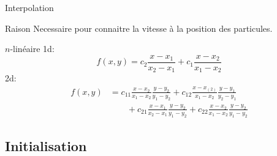 \begin{frame}{Interpolation}
\begin{block}{Raison}
 Necessaire pour connaitre la vitesse à la position des particules.
\end{block}

 \begin{block}{$n$-linéaire}
  1d:
  \begin{equation*}
	f(x,y)=c_2\frac{x-x_{1}}{x_{2}-x_{1}}+c_1\frac{x-x_{2}}{x_{1}-x_{2}}
\end{equation*}
  2d:
  \begin{align*}
	f(x,y)&=c_{11}\frac{x-x_{2}}{x_{1}-x_{2}}\frac{y-y_{2}}{y_{1}-y_{2}}+c_{12}\frac{x-x_(2)}{x_{1}-x_{2}}\frac{y-y_{1}}{y_{2}-y_{1}}
	\\
	&\qquad+c_{21}\frac{x-x_{1}}{x_{2}-x_{1}}\frac{y-y_{2}}{y_{1}-y_{2}}+c_{22}\frac{x-x_{2}}{x_{1}-x_{2}}\frac{y-y_{2}}{y_{1}-y_{2}}
\end{align*}
 \end{block}

\end{frame}

\subsection{Initialisation}

